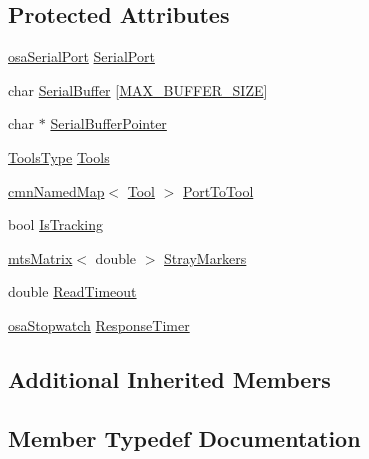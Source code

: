 \subsection*{Protected Attributes}
\begin{DoxyCompactItemize}
\item 
\hyperlink{classosa_serial_port}{osa\+Serial\+Port} \hyperlink{classmts_n_d_i_serial_a76b386e7f977b85ee1e48f7126063aa7}{Serial\+Port}
\item 
char \hyperlink{classmts_n_d_i_serial_ae5b23b322f963e10ebcc04902864eebf}{Serial\+Buffer} \mbox{[}\hyperlink{classmts_n_d_i_serial_a10d136b08ef709839e26c8ba9c0b2a1aa5a2ba9c836a108b8648fa0887336f5cd}{M\+A\+X\+\_\+\+B\+U\+F\+F\+E\+R\+\_\+\+S\+I\+Z\+E}\mbox{]}
\item 
char $\ast$ \hyperlink{classmts_n_d_i_serial_a7017ac2bda0bd5a4aa0d8dc8e4aaf2f8}{Serial\+Buffer\+Pointer}
\item 
\hyperlink{classmts_n_d_i_serial_aa7927ca6826aae84f89df0ca800fe6bd}{Tools\+Type} \hyperlink{classmts_n_d_i_serial_adae8811079b92709d39a1818eba867c1}{Tools}
\item 
\hyperlink{classcmn_named_map}{cmn\+Named\+Map}$<$ \hyperlink{classmts_n_d_i_serial_1_1_tool}{Tool} $>$ \hyperlink{classmts_n_d_i_serial_a9e780c436ba6d57152ef11c722771034}{Port\+To\+Tool}
\item 
bool \hyperlink{classmts_n_d_i_serial_a9908b1079e158ad8d708d5ff00bd953f}{Is\+Tracking}
\item 
\hyperlink{classmts_matrix}{mts\+Matrix}$<$ double $>$ \hyperlink{classmts_n_d_i_serial_a061167330c608d025a0d6a6c9782b552}{Stray\+Markers}
\item 
double \hyperlink{classmts_n_d_i_serial_a09bb13f36457efa0528f4ca880ce1891}{Read\+Timeout}
\item 
\hyperlink{classosa_stopwatch}{osa\+Stopwatch} \hyperlink{classmts_n_d_i_serial_a78f53a7d4b1caa4fca9ee1a835ed16be}{Response\+Timer}
\end{DoxyCompactItemize}
\subsection*{Additional Inherited Members}


\subsection{Member Typedef Documentation}
\hypertarget{classmts_n_d_i_serial_aa7927ca6826aae84f89df0ca800fe6bd}{}
